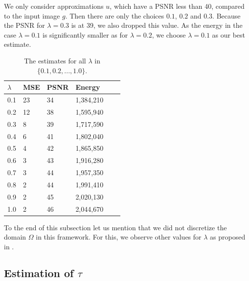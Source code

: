 \documentclass{scrreprt}
\begin{document}
            We only consider approximations $u$, which have a PSNR less than 40, compared to the input image $g$. Then there are only the choices $0.1$, $0.2$ and $0.3$. Because the PSNR for $\lambda = 0.3$ is at 39, we also dropped this value. As the energy in the case $\lambda = 0.1$ is significantly smaller as for $\lambda = 0.2$, we choose $\lambda = 0.1$ as our best estimate.

            \begin{table}[!ht]
                \centering
                \begin{tabular}{| l | l | l | l | l | l |}
                \hline
                $\lambda$ & MSE & PSNR & Energy \\ \hline\hline
                0.1 & 23 & 34 & 1,384,210 \\ \hline
                0.2 & 12 & 38 & 1,595,940 \\ \hline
                0.3 & 8 & 39 & 1,717,590 \\ \hline
                0.4 & 6 & 41 & 1,802,040 \\ \hline
                0.5 & 4 & 42 & 1,865,850 \\ \hline
                0.6 & 3 & 43 & 1,916,280 \\ \hline
                0.7 & 3 & 44 & 1,957,350 \\ \hline
                0.8 & 2 & 44 & 1,991,410 \\ \hline
                0.9 & 2 & 45 & 2,020,130 \\ \hline
                1.0 & 2 & 46 & 2,044,670 \\ \hline
                \end{tabular}
                \caption[Overview of values for $\lambda$ for the ROF model.]{The estimates for all $\lambda$ in $\{0.1, 0.2, ..., 1.0\}$.}
                \label{tab:best_fit_compare}
            \end{table}

        To the end of this subsection let us mention that we did not discretize the domain $\Omega$ in this framework. For this, we observe other values for $\lambda$ as proposed in \cite{Chambolle10afirst-order}.

        \subsection{Estimation of $\tau$}
        \label{sub:estimation_of_tau_rof}
\end{document}
